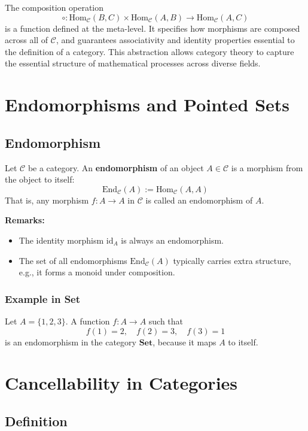 \documentclass[10pt]{article}
\theoremstyle{plain}
\theoremstyle{definition}
\begin{document}
The composition operation
\[
\circ : \text{Hom}_\mathcal{C}(B, C) \times \text{Hom}_\mathcal{C}(A, B) \to \text{Hom}_\mathcal{C}(A, C)
\]
is a function defined at the meta-level. It specifies how morphisms are composed across all of \( \mathcal{C} \), and guarantees associativity and identity properties essential to the definition of a category. This abstraction allows category theory to capture the essential structure of mathematical processes across diverse fields.

\section*{Endomorphisms and Pointed Sets}

\subsection*{Endomorphism}

Let \( \mathcal{C} \) be a category. An \textbf{endomorphism} of an object \( A \in \mathcal{C} \) is a morphism from the object to itself:
\[
\text{End}_\mathcal{C}(A) := \text{Hom}_\mathcal{C}(A, A)
\]
That is, any morphism \( f: A \to A \) in \( \mathcal{C} \) is called an endomorphism of \( A \).

\textbf{Remarks:}
\begin{itemize}
	\item The identity morphism \( \text{id}_A \) is always an endomorphism.
	\item The set of all endomorphisms \( \text{End}_\mathcal{C}(A) \) typically carries extra structure, e.g., it forms a monoid under composition.
\end{itemize}

\subsubsection*{Example in \textbf{Set}}

Let \( A = \{1, 2, 3\} \). A function \( f: A \to A \) such that
\[
f(1) = 2, \quad f(2) = 3, \quad f(3) = 1
\]
is an endomorphism in the category \( \textbf{Set} \), because it maps \( A \) to itself.

\section*{Cancellability in Categories}

\subsection*{Definition}
\end{document}
